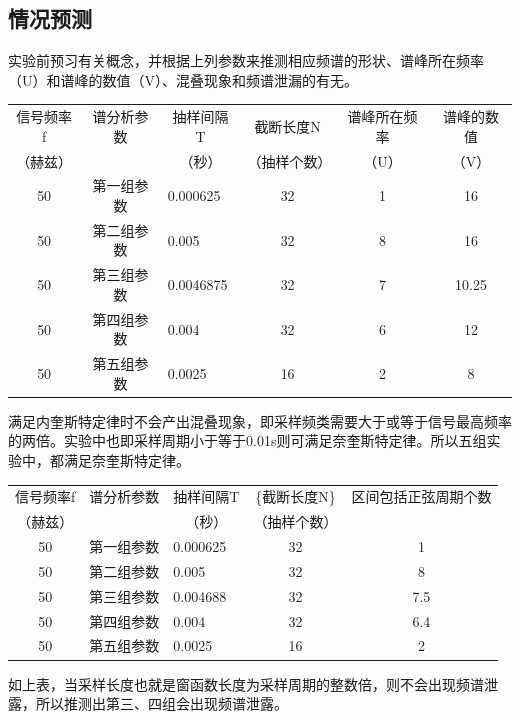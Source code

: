 \documentclass{../source/Experiment copy}
\begin{document}
\subsection{情况预测}
实验前预习有关概念，并根据上列参数来推测相应频谱的形状、谱峰所在频率（U）和谱峰的数值（V）、混叠现象和频谱泄漏的有无。
\begin{table}[H]
    \centering
    \begin{tabular}{|c|c|l|c|c|c|}
        \hline
        信号频率f & 谱分析参数 & \multicolumn{1}{c|}{抽样间隔T} & 截断长度N    & 谱峰所在频率 & 谱峰的数值 \\
        （赫兹）  &            & \multicolumn{1}{c|}{（秒）}    & （抽样个数） & （U）        & （V）      \\ \hline
        50        & 第一组参数 & 0.000625                       & 32           & 1            & 16         \\ \hline
        50        & 第二组参数 & 0.005                          & 32           & 8            & 16         \\ \hline
        50        & 第三组参数 & 0.0046875                      & 32           & 7            & 10.25      \\ \hline
        50        & 第四组参数 & 0.004                          & 32           & 6            & 12         \\ \hline
        50        & 第五组参数 & 0.0025                         & 16           & 2            & 8          \\ \hline
    \end{tabular}
\end{table}

满足内奎斯特定律时不会产出混叠现象，即采样频类需要大于或等于信号最高频率的两倍。实验中也即采样周期小于等于0.01s则可满足奈奎斯特定律。所以五组实验中，都满足奈奎斯特定律。
\begin{table}[H]
    \centering
    \begin{tabular}{|c|c|l|c|c|}
        \hline
        信号频率f & 谱分析参数 & \multicolumn{1}{c|}{抽样间隔T} & \{截断长度N\} & 区间包括正弦周期个数 \\
        （赫兹）  &            & \multicolumn{1}{c|}{（秒）}    & （抽样个数）  &                      \\ \hline
        50        & 第一组参数 & 0.000625                       & 32            & 1                    \\ \hline
        50        & 第二组参数 & 0.005                          & 32            & 8                    \\ \hline
        50        & 第三组参数 & 0.004688                       & 32            & 7.5                  \\ \hline
        50        & 第四组参数 & 0.004                          & 32            & 6.4                  \\ \hline
        50        & 第五组参数 & 0.0025                         & 16            & 2                    \\ \hline
    \end{tabular}
\end{table}
如上表，当采样长度也就是窗函数长度为采样周期的整数倍，则不会出现频谱泄露，所以推测出第三、四组会出现频谱泄露。
\end{document}
